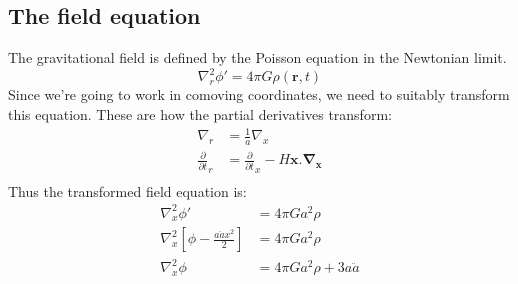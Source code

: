 \documentclass[12pt,a4paper,oneside]{book}
\begin{document}
		\subsection{The field equation}
			The gravitational field is defined by the Poisson equation in the Newtonian limit.
			\begin{equation}
			\nabla_r^2\phi'=4\pi G\rho(\mathbf{r},t)
			\end{equation}
			Since we're going to work in comoving coordinates, we need to suitably transform this equation. These are how the partial derivatives transform:
			\begin{equation}
				\begin{aligned}
					\nabla_r&=\frac{1}{a}\nabla_x\\
					\frac{\partial}{\partial t}_r&=\frac{\partial}{\partial t}_x-H\mathbf{x.\nabla_x}\\
				\end{aligned}
				\label{eq:transform}
			\end{equation}
			Thus the transformed field equation is:
			\begin{equation}
				\begin{aligned}
					\nabla^2_x\phi'&=4\pi Ga^2\rho\\
					\nabla^2_x\left[\phi-\frac{a\ddot{a}x^2}{2}\right]&=4\pi Ga^2\rho\\
					\nabla_x^2\phi&=4\pi Ga^2\rho+3a\ddot{a}\\
				\end{aligned}
				\label{eq:phi_x}
			\end{equation}
			
\end{document}
